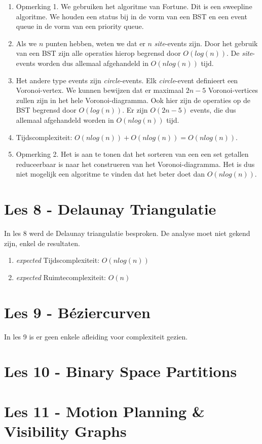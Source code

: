 \documentclass[12pt,a4paper]{article}
\begin{document}
		\begin{enumerate}
			\item Opmerking 1. We gebruiken het algoritme van Fortune. Dit is een sweepline algoritme. We houden een status bij in de vorm van een BST en een event queue in de vorm van een priority queue.
			\item Als we $n$ punten hebben, weten we dat er $n$ \emph{site}-events zijn. Door het gebruik van een BST zijn alle operaties hierop begrensd door $O(log (n))$. De \emph{site}-events worden dus allemaal afgehandeld in $O(n log (n))$ tijd. 
			\item Het andere type events zijn \emph{circle}-events. Elk \emph{circle}-event definieert een Voronoi-vertex. We kunnen bewijzen dat er maximaal $2n - 5$ Voronoi-vertices zullen zijn in het hele Voronoi-diagramma. Ook hier zijn de operaties op de BST begrensd door $O(log (n))$. Er zijn $O(2n - 5)$ events, die dus allemaal afgehandeld worden in $O(n log (n))$ tijd.
			\item Tijdscomplexiteit: $O(n log (n)) + O(n log (n)) = O(n log (n))$.				
			\item Opmerking 2. Het is aan te tonen dat het sorteren van een een set getallen reduceerbaar is naar het construeren van het Voronoi-diagramma. Het is dus niet mogelijk een algoritme te vinden dat het beter doet dan $O(n log (n))$. 
		\end{enumerate}
	
	\section{Les 8 - Delaunay Triangulatie}
		In les 8 werd de Delaunay triangulatie besproken. De analyse moet niet gekend zijn, enkel de resultaten. 
	
		\begin{enumerate}
			\item \emph{expected} Tijdscomplexiteit: $O(n log (n))$
			\item \emph{expected} Ruimtecomplexiteit: $O(n)$
		\end{enumerate}	
		
	\section{Les 9 - Béziercurven}
		In les 9 is er geen enkele afleiding voor complexiteit gezien. 
		
	\section{Les 10 - Binary Space Partitions}
	\section{Les 11 - Motion Planning \& Visibility Graphs}
		
\end{document}
